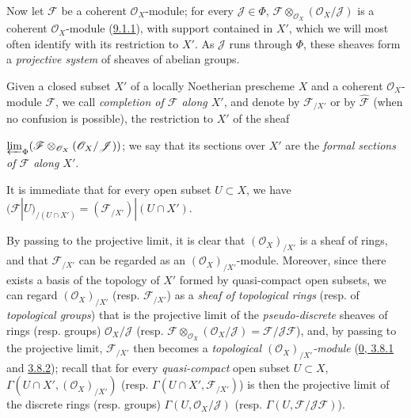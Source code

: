 \begin{env}[10.8.3]
\label{I.10.8.3}
Now let $\mathscr{F}$ be a coherent $\mathscr{O}_X$-module; for
every $\mathscr{J}\in\Phi$,
$\mathscr{F}\otimes_{\mathscr{O}_X}(\mathscr{O}_X/\mathscr{J})$ is a
coherent $\mathscr{O}_X$-module
(\hyperref[I.9.1.1]{9.1.1}), with support contained in $X'$, which we
will most often identify with its restriction to $X'$. As
$\mathscr{J}$ runs through $\Phi$, these sheaves form a
\emph{projective system} of sheaves of abelian groups.
\end{env}

\begin{definition}[10.8.4]
\label{I.10.8.4}
Given a closed subset $X'$ of a locally Noetherian prescheme
$X$ and a coherent $\mathscr{O}_X$-module $\mathscr{F}$, we call
\emph{completion of $\mathscr{F}$ along $X'$}, and denote by
$\mathscr{F}_{/X'}$ or by $\widehat{\mathscr{F}}$ (when no confusion
is possible), the restriction to $X'$ of the sheaf


$\varprojlim_{\Phi}
(\mathscr{F}\otimes_{\mathscr{O}_X}
(\mathscr{O}_X/\mathscr{J}))$; we say that its sections over $X'$ are
the \emph{formal sections of $\mathscr{F}$ along $X'$}.
\end{definition}

It is immediate that for every open subset $U\subset X$, we have
$(\mathscr{F}|U)_{/(U\cap X')}=(\mathscr{F}_{/X'})|(U\cap X')$.

By passing to the projective limit, it is clear that
$(\mathscr{O}_X)_{/X'}$ is a sheaf of rings, and that
$\mathscr{F}_{/X'}$ can be regarded as an
$(\mathscr{O}_X)_{/X'}$-module. Moreover, since there exists a basis of
the topology of $X'$ formed by quasi-compact open subsets, we can regard
$(\mathscr{O}_X)_{/X'}$ (resp. $\mathscr{F}_{/X'}$) as a
\emph{sheaf of topological rings} (resp. of
\emph{topological groups}) that is the projective limit of the
\emph{pseudo-discrete} sheaves of rings (resp. groups)
$\mathscr{O}_X/\mathscr{J}$ (resp.
$\mathscr{F}\otimes_{\mathscr{O}_X}
(\mathscr{O}_X/\mathscr{J})=\mathscr{F}/\mathscr{J}\mathscr{F}$), and, by
passing to the projective limit, $\mathscr{F}_{/X'}$ then becomes a
\emph{topological $(\mathscr{O}_X)_{/X'}$-module}
(\hyperref[0.3.8.1]{0, 3.8.1} and
\hyperref[0.3.8.2]{3.8.2}); recall that for every
\emph{quasi-compact} open subset $U\subset X$,
$\Gamma(U\cap X',(\mathscr{O}_X)_{/X'})$ (resp.
$\Gamma(U\cap X',\mathscr{F}_{/X'})$) is then the projective limit of
the discrete rings (resp. groups) $\Gamma(U,\mathscr{O}_X/\mathscr{J})$
(resp. $\Gamma(U,\mathscr{F}/\mathscr{J}\mathscr{F})$).

